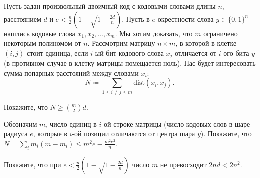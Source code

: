 Пусть задан произвольный двоичный код с кодовыми словами длины $n$, расстоянием $d$ и $e < \frac{n}{2}(1
- \sqrt{1 - \frac{2d}{n}})$. Пусть в $e$-окрестности слова $y \in \{0, 1\}^n$ нашлись кодовые слова $x_1,
x_2, \dots, x_m$. Мы хотим доказать, что $m$ ограничено некоторым полиномом от $n$. Рассмотрим матрицу $n
\times m$, в которой в клетке $(i, j)$ стоит единица, если $i$-ый бит кодового слова $x_j$ отличается от
$i$-ого бита $y$ (в противном случае в клетку матрицы помещается ноль). Нас будет интересовать сумма
попарных расстояний между словами $x_i$:
$$N \coloneqq \sum\limits_{1 \le i \neq j \le m} \mathrm{dist}(x_i, x_j).$$

\begin{enumcyr}
    \item Покажите, что $N \ge \binom{m}{2} d$.
    \item Обозначим $m_i$ число единиц в $i$-ой строке матрицы (число кодовых слов в шаре радиуса $e$,
        которые в $i$-ой позиции отличаются от центра шара $y$). Покажите, что $N = \sum\limits_{i} m_i
        (m - m_i) \le m^2 e - \frac{m^2 e^2}{n}$.
    \item Покажите, что при $e < \frac{n}{2}(1 - \sqrt{1 - \frac{2d}{n}})$ число $m$ не превосходит $2nd
        < 2n^2$.
\end{enumcyr}